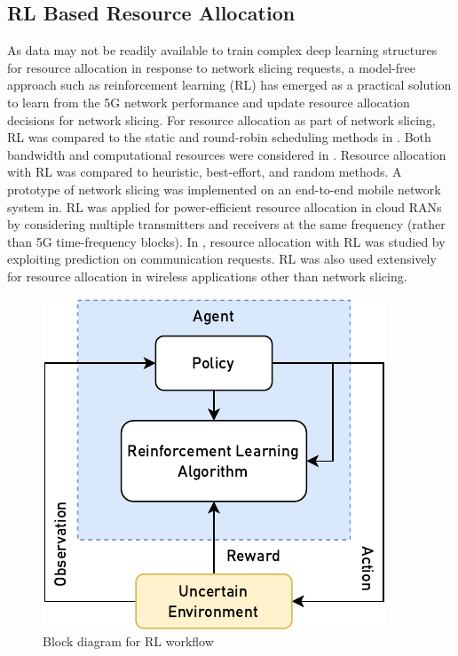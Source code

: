 \documentclass[conference]{IEEEtran}
\begin{document}
\subsection{RL Based Resource Allocation}
As data may not be readily available to train complex deep learning structures for resource allocation in response to network slicing requests, a model-free approach such as reinforcement learning (RL) has emerged as a practical solution to learn from the 5G network performance and update resource allocation decisions for network slicing. For resource allocation as part of network slicing, RL was compared to the static and round-robin scheduling methods in \cite{guo2019adaptive}. Both bandwidth and computational resources were considered in \cite{naderializadeh2021resource}. Resource allocation with RL was compared to heuristic, best-effort, and random methods. A prototype of network slicing was implemented on an end-to-end mobile network system in. RL was applied  for power-efficient resource allocation in cloud RANs by considering multiple transmitters and receivers at the same frequency (rather than 5G time-frequency blocks). In \cite{wilhelmi2017implications}, resource allocation with RL was studied by exploiting prediction on communication requests. RL was also used extensively for resource allocation in wireless applications other than network slicing.

\begin{figure}[htbp!]
    \centering
    \includegraphics{figures/RL.pdf}
    \caption{Block diagram for RL workflow}
    \label{fig:rl}
\end{figure}
\end{document}
